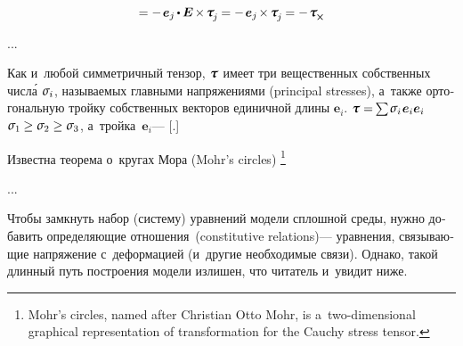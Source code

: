 \begin{otherlanguage}{russian}
\begin{multline*}
= - \hspace{.25ex} \bm{e}_{j} \hspace{-0.15ex} \dotp \hspace{-0.1ex} \bm{E} \hspace{-0.2ex} \times \hspace{-0.25ex} \tractionvector{j}
= - \hspace{.25ex} \bm{e}_{j} \hspace{-0.25ex} \times \hspace{-0.2ex} \tractionvector{j}
= - \hspace{.2ex} \cauchystress_{\hspace{-0.1ex}\Xcompanion}
\end{multline*}


...


\end{otherlanguage}



\begin{otherlanguage}{russian}

Как и~любой симметричный тензор, $\cauchystress$ имеет три вещественных собственных числ\'{а} $\mathsigma_i$, называемых главными напряжениями (principal stresses), а~также ортогональную тройку собственных векторов единичной длины $\bm{e}_i$.
 ${\cauchystress = \hspace{-0.2ex} \sum \hspace{-0.16ex} \mathsigma_i \hspace{.16ex} \bm{e}_i \bm{e}_i}$   ${\mathsigma_1 \hspace{-0.1ex} \geq \mathsigma_2 \geq \mathsigma_3}$, а~тройка~${\bm{e}_i}$\:--- [.]

Известна теорема о~кругах Мора (Mohr’s circles)%
\footnote{Mohr’s circles, named after Christian Otto Mohr, is a~two-dimensional graphical representation of transformation for the Cauchy stress tensor.}

...



Чтобы замкнуть набор (систему) уравнений модели сплошной среды, нужно добавить определяющие отношения~(constitutive relations)\:--- уравнения, связывающие напряжение с~деформацией (и~другие необходимые связи). Однако,   такой длинный путь построения модели излишен, что читатель и~увидит ниже.

\end{otherlanguage}

